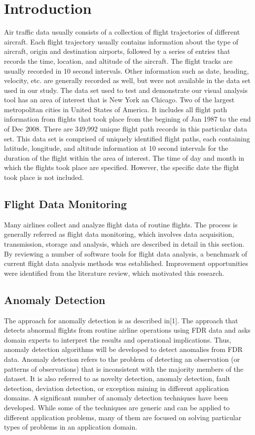 \section{Introduction}
Air traffic data usually consists of a collection of flight trajectories of different aircraft. Each flight trajectory usually contains information about the type of aircraft, origin and destination airports, followed by a series of entries that records the time, location, and altitude of the aircraft. The flight tracks are usually recorded in 10 second intervals. Other information such as date, heading, velocity, etc. are generally
recorded as well, but were not available in the data set used in our study. The data set used to test and demonstrate our visual analysis tool has an area of interest that is New York an Chicago. Two of the largest metropolitan cities in United States of America. It includes all flight path information from flights that took place from the begining of Jan 1987 to the end of Dec 2008. There are 349,992 unique flight path records in this particular data set. This data set is comprised of uniquely identified flight paths, each containing latitude, longitude, and altitude information at 10 second intervals for the duration of the flight within the area of interest. The time of day and month in which the flights took place are specified. However, the specific date the flight took place is not included.

\subsection{Flight Data Monitoring}\cite{li2013anomally}
Many airlines collect and analyze flight data of routine flights. The process is generally referred as flight data monitoring, which involves data acquisition, transmission, storage and analysis, which are described in detail in this section. By reviewing a number of software tools for flight data analysis, a benchmark of current flight data analysis methods was established. Improvement opportunities were identified from the literature review, which motivated this research.
\subsection{Anomaly Detection}
The approach for anomally detection is as described in[1]. The approach that detects abnormal flights from routine airline operations using FDR data and asks domain experts to interpret the results and operational implications. Thus, anomaly detection algorithms will be developed to detect anomalies from FDR data.
Anomaly detection refers to the problem of detecting an observation (or patterns of observations) that is inconsistent with the majority members of the dataset. It is also referred to as novelty detection, anomaly detection, fault detection, deviation detection, or exception mining in different application domains. A significant number of anomaly detection techniques have been developed. While some of the techniques are generic and can be applied to different application problems, many of them are focused on solving particular types of problems in an application domain.

